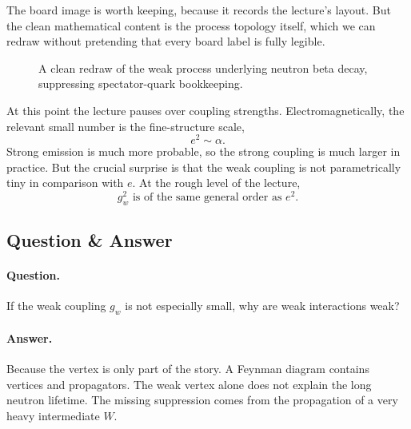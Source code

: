 The board image is worth keeping, because it records the lecture's layout. But the clean mathematical content is the process topology itself, which we can redraw without pretending that every board label is fully legible.

\begin{figure}[htbp]
\centering
{}
\caption{A clean redraw of the weak process underlying neutron beta decay, suppressing spectator-quark bookkeeping.}
\end{figure}

At this point the lecture pauses over coupling strengths. Electromagnetically, the relevant small number is the fine-structure scale,
\begin{equation}
e^2 \sim \alpha.
\end{equation}
Strong emission is much more probable, so the strong coupling is much larger in practice. But the crucial surprise is that the weak coupling is not parametrically tiny in comparison with \(e\). At the rough level of the lecture,
\begin{equation}
g_w^2 \text{ is of the same general order as } e^2.
\end{equation}

\subsection{Question \& Answer}

\paragraph{Question.} If the weak coupling \(g_w\) is not especially small, why are weak interactions weak?

\paragraph{Answer.} Because the vertex is only part of the story. A Feynman diagram contains vertices and propagators. The weak vertex alone does not explain the long neutron lifetime. The missing suppression comes from the propagation of a very heavy intermediate \(W\).


